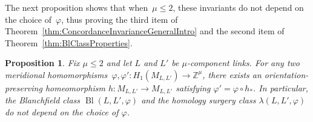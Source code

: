 \documentclass[10.9pt,a4paper]{amsart}
\newtheorem{proposition}[theorem]{Proposition}
\theoremstyle{definition}
\theoremstyle{remark}
\newcommand{\Z}{\mathbb{Z}}
\newcommand{\Bl}{\operatorname{Bl}}
\begin{document}
The next proposition shows that when~$\mu \leq 2$,  these invariants do not depend on the choice of~$\varphi$, thus proving the third item of Theorem~\ref{thm:ConcordanceInvarianceGeneralIntro} and the second item of Theorem~\ref{thm:BlClassProperties}.


\begin{proposition}
\label{prop:mu=2Indep}
Fix $\mu \leq 2$ and let $L$ and $L'$ be $\mu$-component links.
For any two meridional homomorphisms~$\varphi,\varphi' \colon H_1(M_{L,L'}) \to \Z^\mu$, there exists an orientation-preserving homeomorphism $h \colon M_{L,L'} \to M_{L,L'}$ satisfying $\varphi'=\varphi\circ h_*$.
In particular,  the Blanchfield class $\Bl(L,L',\varphi)$ and the homology surgery class $\lambda(L,L',\varphi)$ do not depend on the choice of $\varphi$.
\end{proposition}
\end{document}
